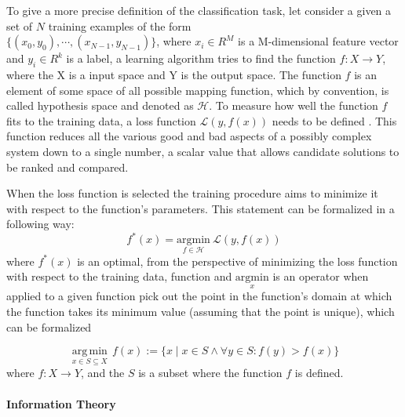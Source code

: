 To give a more precise definition of the classification task, let consider a given a set of $N$ training examples of the form \\ $\{(x_0,y_0), \dotsb , (x_{N-1} , y_{N-1})\}$, where $x_{i} \in R^{M}$ is a M-dimensional feature vector and $y_i \in R^{k}$ is a label, a learning algorithm tries to find the function $f: X\rightarrow Y$, where the X is a input space and Y is the output space. The function $f$ is an element of some space of all possible mapping function, which by convention, is called hypothesis space and denoted as $\mathcal{H}$. To measure how well the function $f$ fits to the training data, a loss function $\mathcal{L}(y,f(x))$ needs to be defined \cite{DLBook}. This function reduces all the various good and bad aspects of a possibly complex system down to a single number, a scalar value that allows candidate solutions to be ranked and compared.


When the loss function is selected the training procedure aims to minimize it with respect to the function's parameters. This statement can be formalized in a following way: 
\begin{equation} \label{eq:loss}
f^*(x) = \underset{f \in \mathcal{H}}{\mathrm{argmin}} ~  \mathcal{L}(y,f(x))
\end{equation}
where $f^*(x)$ is an optimal, from the perspective of minimizing the loss function with respect to the training data, function and $ \underset{x}{\mathrm{argmin}}$ is an operator when applied to a given function pick out the point in the function's domain at which the function takes its minimum value (assuming that the point is unique), which can be formalized

\begin{equation}
   \underset{x\in S\subseteq X}{\operatorname{arg\,min}}\, f(x) := \{x \mid x\in S \wedge \forall y \in S : f(y) > f(x)\}
\end{equation}
where $f:X \rightarrow Y$, and the $S$ is a subset where the function $f$ is defined.  

\paragraph{Information Theory} \mbox{}
 
